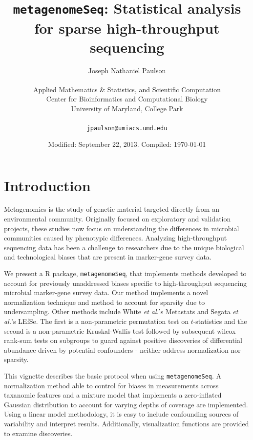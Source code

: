 \documentclass[a4paper,11pt]{article}\usepackage[]{graphicx}\usepackage[]{color}
\begin{document}
\title{{\textbf{\texttt{metagenomeSeq}: Statistical analysis for sparse high-throughput sequencing}}}
\author{Joseph Nathaniel Paulson\\[1em]\\ Applied Mathematics $\&$ Statistics, and Scientific Computation\\ Center for Bioinformatics and Computational Biology\\ University of Maryland, College Park\\[1em]\\ \texttt{jpaulson@umiacs.umd.edu}}
\date{Modified: September 22, 2013. Compiled: \today}
\maketitle
\tableofcontents

\newpage




\section{Introduction}

Metagenomics is the study of genetic material targeted directly from an environmental community. 
Originally focused on exploratory and validation projects, these studies now focus on understanding the differences in microbial communities caused by phenotypic differences. 
Analyzing high-throughput sequencing data has been a challenge to researchers due to the unique biological and technological biases that are present in marker-gene survey data.

 We present a R package, \texttt{metagenomeSeq}, that implements methods developed to account for previously unaddressed biases specific to high-throughput sequencing microbial marker-gene survey data. Our method implements a novel normalization technique and method to account for sparsity due to undersampling. Other methods include
 White \textit{et al.}'s Metastats and Segata \textit{et al.}'s LEfSe. The first is a non-parametric permutation test on $t$-statistics and the second is a non-parametric Kruskal-Wallis test followed by subsequent wilcox rank-sum tests on subgroups to guard against positive discoveries of differential abundance driven by potential confounders - neither address normalization nor sparsity.

This vignette describes the basic protocol when using \texttt{metagenomeSeq}. 
A normalization method able to control for biases in measurements across taxanomic features and a mixture model that implements a zero-inflated Gaussian distribution to account for varying depths of coverage are implemented.
Using a linear model methodology, it is easy to include confounding sources of variability and interpret results. 
Additionally, visualization functions are provided to examine discoveries. 
\end{document}
